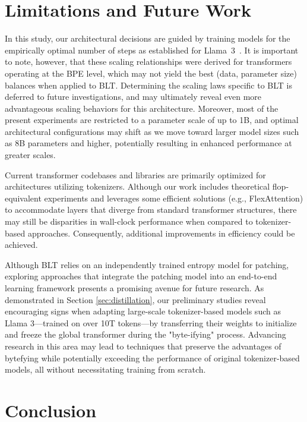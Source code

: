 \section{Limitations and Future Work}

In this study, our architectural decisions are guided by training models for the empirically optimal number of steps as established for Llama~3~\citep{dubey2024llama}. It is important to note, however, that these scaling relationships were derived for transformers operating at the BPE level, which may not yield the best (data, parameter size) balances when applied to {\textsc BLT}. Determining the scaling laws specific to {\textsc BLT} is deferred to future investigations, and may ultimately reveal even more advantageous scaling behaviors for this architecture. Moreover, most of the present experiments are restricted to a parameter scale of up to 1B, and optimal architectural configurations may shift as we move toward larger model sizes such as 8B parameters and higher, potentially resulting in enhanced performance at greater scales.

Current transformer codebases and libraries are primarily optimized for architectures utilizing tokenizers. Although our work includes theoretical flop-equivalent experiments and leverages some efficient solutions (e.g., FlexAttention) to accommodate layers that diverge from standard transformer structures, there may still be disparities in wall-clock performance when compared to tokenizer-based approaches. Consequently, additional improvements in efficiency could be achieved.

Although {\textsc BLT} relies on an independently trained entropy model for patching, exploring approaches that integrate the patching model into an end-to-end learning framework presents a promising avenue for future research. As demonstrated in Section \ref{sec:distillation}, our preliminary studies reveal encouraging signs when adapting large-scale tokenizer-based models such as Llama 3—trained on over 10T tokens—by transferring their weights to initialize and freeze the global transformer during the "byte-ifying" process. Advancing research in this area may lead to techniques that preserve the advantages of bytefying while potentially exceeding the performance of original tokenizer-based models, all without necessitating training from scratch.

\section{Conclusion}
\label{section:conclusion}


